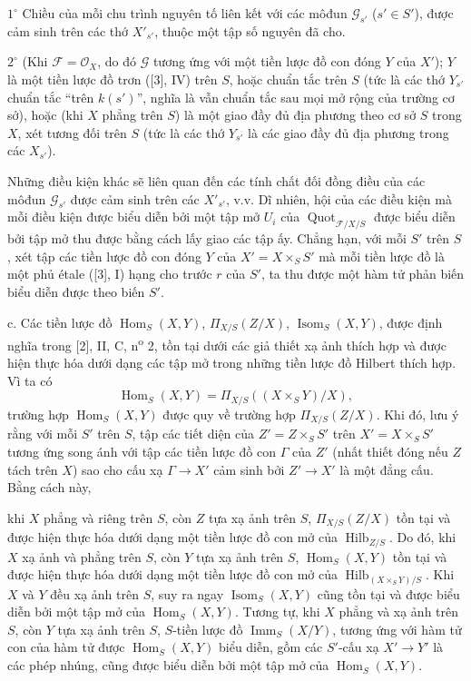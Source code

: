 \documentclass[11pt,twoside,openany]{book}
\numberwithin{equation}{section}
\newcommand{\src}[1]{%
  \phantomsection\hypertarget{src:\fgasourceid:#1}{}%
  \marginpar{\raggedleft\footnotesize\sffamily #1}%
}
\newcommand{\fgasourceid}{unset}
\begin{document}
\smallskip
\noindent $1^\circ$ Chiều của mỗi chu trình nguyên tố liên kết với các môđun
$\mathcal G_{s'}$ ($s'\in S'$), được cảm sinh trên các thớ $X'_{s'}$, thuộc
một tập số nguyên đã cho.

\smallskip
\noindent $2^\circ$ (Khi $\mathcal F=\mathcal O_X$, do đó $\mathcal G$ tương
ứng với một tiền lược đồ con đóng $Y$ của $X'$); $Y$ là một tiền lược đồ trơn
([3], IV) trên $S$, hoặc chuẩn tắc trên $S$ (tức là các thớ $Y_{s'}$ chuẩn
tắc ``trên $k(s')$'', nghĩa là vẫn chuẩn tắc sau mọi mở rộng của trường cơ
sở), hoặc (khi $X$ phẳng trên $S$) là một giao đầy đủ địa phương theo cơ sở
$S$ trong $X$, xét tương đối trên $S$ (tức là các thớ $Y_{s'}$ là các giao
đầy đủ địa phương trong các $X_{s'}$).

Những điều kiện khác sẽ liên quan đến các tính chất đối đồng điều
của các môđun $\mathcal G_{s'}$ được cảm sinh trên các $X'_{s'}$, v.v. Dĩ
nhiên, hội của các điều kiện mà mỗi điều kiện được biểu diễn bởi một tập mở
$U_i$ của $\operatorname{Quot}_{\mathcal F/X/S}$ được biểu diễn bởi tập mở thu
được bằng cách lấy giao các tập ấy. Chẳng hạn, với mỗi $S'$ trên $S$, xét tập
các tiền lược đồ con đóng $Y$ của $X'=X\times_SS'$ mà mỗi tiền lược đồ là một
phủ étale ([3], I) hạng cho trước $r$ của $S'$, ta thu được một hàm tử phản biến
biểu diễn được theo biến $S'$.

\medskip
\noindent c. Các tiền lược đồ $\operatorname{Hom}_S(X,Y)$,
$\Pi_{X/S}(Z/X)$, $\operatorname{Isom}_S(X,Y)$, được định nghĩa trong [2], II,
C, n\textsuperscript{o} 2, tồn tại dưới các giả thiết xạ ảnh thích hợp và được
hiện thực hóa dưới dạng các tập mở trong những tiền lược đồ Hilbert thích hợp.
Vì ta có
\[
\operatorname{Hom}_S(X,Y)=\Pi_{X/S}((X\times_SY)/X),
\]
trường hợp $\operatorname{Hom}_S(X,Y)$ được quy về trường hợp
$\Pi_{X/S}(Z/X)$. Khi đó, lưu ý rằng với mỗi $S'$ trên $S$, tập các tiết diện
của $Z'=Z\times_SS'$ trên $X'=X\times_SS'$ tương ứng song ánh với tập các tiền
lược đồ con $\Gamma$ của $Z'$ (nhất thiết đóng nếu $Z$ tách trên $X$) sao cho
cấu xạ $\Gamma\longrightarrow X'$ cảm sinh bởi $Z'\longrightarrow X'$ là một
đẳng cấu. Bằng cách này,
\src{268}
khi $X$ phẳng và riêng trên $S$, còn $Z$ tựa xạ ảnh trên $S$,
$\Pi_{X/S}(Z/X)$ tồn tại và được hiện thực hóa dưới dạng một tiền lược đồ con mở của
$\operatorname{Hilb}_{Z/S}$. Do đó, khi $X$ xạ ảnh và phẳng trên $S$, còn $Y$
tựa xạ ảnh trên $S$, $\operatorname{Hom}_S(X,Y)$ tồn tại và được hiện thực hóa
dưới dạng một tiền lược đồ con mở của
$\operatorname{Hilb}_{(X\times_SY)/S}$. Khi $X$ và $Y$ đều xạ ảnh trên $S$,
suy ra ngay $\operatorname{Isom}_S(X,Y)$ cũng tồn tại và được biểu diễn bởi
một tập mở của $\operatorname{Hom}_S(X,Y)$. Tương tự, khi $X$ phẳng và xạ ảnh
trên $S$, còn $Y$ tựa xạ ảnh trên $S$, $S$-tiền lược đồ
$\operatorname{Imm}_S(X/Y)$, tương ứng với hàm tử con của hàm tử được
$\operatorname{Hom}_S(X,Y)$ biểu diễn, gồm các $S'$-cấu xạ
$X'\longrightarrow Y'$ là các phép nhúng, cũng được biểu diễn bởi một tập mở
của $\operatorname{Hom}_S(X,Y)$.
\end{document}
